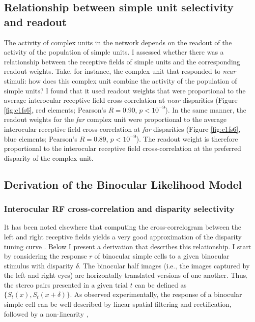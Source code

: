 \subsection*{Relationship between simple unit selectivity and readout}

The activity of complex units in the network depends on the readout of the activity of the population of simple units. I assessed whether there was a relationship between the receptive fields of simple units and the corresponding readout weights. Take, for instance, the complex unit that responded to \textit{near} stimuli: how does this complex unit combine the activity of the population of simple units? I found that it used readout weights that were proportional to the average interocular receptive field cross-correlation at \textit{near} disparities (Figure \ref{fig:c1fs6}, red elements; Pearson's $R=0.90$, $p<10^{-9}$). In the same manner, the readout weights for the \textit{far} complex unit were proportional to the average interocular receptive field cross-correlation at \textit{far} disparities (Figure \ref{fig:c1fs6}, blue elements; Pearson's $R=0.89$, $p<10^{-9}$). The readout weight is therefore proportional to the interocular receptive field cross-correlation at the preferred disparity of the complex unit.

\subsection*{Derivation of the Binocular Likelihood Model}
\subsubsection*{Interocular RF cross-correlation and disparity selectivity}

It has been noted elsewhere that computing the cross-correlogram between the left and right receptive fields yields a very good approximation of the disparity tuning curve \cite{Ferster:1981kl,Tsao:2003pi,Read:2003ij}. Below I present a derivation that describes this relationship. I start by considering the response $r$ of binocular simple cells to a given binocular stimulus with disparity $\delta$. The binocular half images (i.e., the images captured by the left and right eyes) are horizontally translated versions of one another. Thus, the stereo pairs presented in a given trial $t$ can be defined as $\{S_t(x), S_t(x+\delta)\}$. As observed experimentally, the response of a binocular simple cell can be well described by linear spatial filtering and rectification, followed by a non-linearity \cite{Ohzawa:1990cq,Anzai:1999uq},

